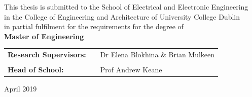 \documentclass[11pt,english,british]{report}
\begin{document}
\begin{titlepage}
\bigskip{}

\begin{center}
{\large{}This thesis is submitted to the School of Electrical and Electronic Engineering\\\vspace{0.5cm}
in the College of Engineering and Architecture of University College Dublin \\ \vspace{0.5cm}
in partial fulfilment for the requirements for the degree of \\ \vspace{0.5cm}
\textbf{Master of Engineering} }
\end{center}

\vspace{1.cm}


{\Large{}\bigskip{}
\bigskip{}
}{\Large \par}

\noindent \begin{center}
\begin{tabular}{lll}
\textbf{\large{}Research Supervisors:} & \qquad{}\qquad{} & {\large{}Dr Elena Blokhina \& Brian Mulkeen}\tabularnewline
&  & \tabularnewline
\textbf{\large{}Head of School:} & \qquad{}\qquad{} & {\large{}Prof Andrew Keane}\tabularnewline
\end{tabular}

\par\end{center}

\vspace{1cm}
\noindent \begin{center}
{\large{}April 2019}
\par\end{center}{\large \par}

\end{titlepage}



\setcounter{page}{1} 
{}
\fancyhead{}
\end{document}
